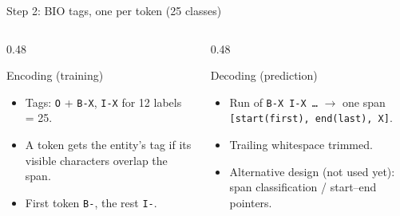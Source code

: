 \documentclass[aspectratio=169,11pt]{beamer}
\newcommand{\code}[1]{\texttt{\small #1}}
\begin{document}
\begin{frame}{Step 2: BIO tags, one per token (25 classes)}
  \footnotesize
  \begin{center}
  \end{center}
  \begin{columns}[T]
    \begin{column}{0.48\textwidth}
      \begin{block}{Encoding (training)}
        \begin{itemize}
          \item Tags: \code{O} + \code{B-X}, \code{I-X} for 12 labels = 25.
          \item A token gets the entity's tag if its visible characters overlap the span.
          \item First token \code{B-}, the rest \code{I-}.
        \end{itemize}
      \end{block}
    \end{column}
    \begin{column}{0.48\textwidth}
      \begin{block}{Decoding (prediction)}
        \begin{itemize}
          \item Run of \code{B-X I-X \ldots} $\to$ one span \code{[start(first), end(last), X]}.
          \item Trailing whitespace trimmed.
          \item Alternative design (not used yet): span classification / start--end pointers.
        \end{itemize}
      \end{block}
    \end{column}
  \end{columns}
\end{frame}
\end{document}
